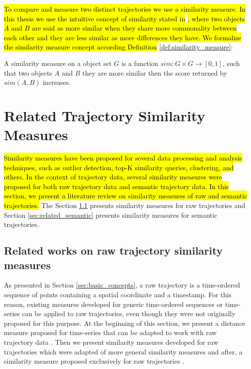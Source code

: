 \hl{To compare and measure two distinct trajectories we use a similarity measure. In this thesis we use the intuitive concept of similarity stated in }\cite{lin1998information}\hl{, where two objects $A$ and $B$ are said as more similar when they share more commonality between each other and they are less similar as more differences they have. We formalize the similarity measure concept according Definition }\ref{def:similarity_measure}:

\begin{definition}
\label{def:similarity_measure}
A similarity measure on a object set $G$ is a function $sim: G \times G \to [0,1]$, such that two objects $A$ and $B$ they are more similar then the score returned by $sim(A, B)$ increases.
\end{definition}

\section{Related Trajectory Similarity Measures} \label{sec:related_measures}

\hl{Similarity measures have been proposed for several data processing and analysis techniques, such as outlier detection, top-K similarity queries, clustering, and others. In the context of trajectory data, several similarity measures were proposed for both raw trajectory data and semantic trajectory data. In this section, we present a literature review on similarity measures of raw and semantic trajectories.}
The Section \ref{sec:related_raw} presents similarity measures for raw trajectories and Section \ref{sec:related_semantic} presents similarity measures for semantic trajectories.


\subsection{Related works on raw trajectory similarity measures} \label{sec:related_raw}
{As presented in Section {\ref{sec:basic_concepts},} a raw trajectory is a time-ordered sequence of points containing a spatial coordinate and a timestamp. For this reason, existing measures developed for generic time-ordered sequences or time-series can be applied to raw trajectories, even though they were not originally proposed for this purpose. At the beginning of this section, we present a distance measure proposed for time-series }\cite{berndt1994using}{ that can be adapted to work with raw trajectory data }\cite{ten2007multi}{. Then we present similarity measures developed for raw trajectories which were adapted of more general similarity measures }\cite{eiter1994computing, Ding:2008:ESJ:1440463.1440989, vlachos2002discovering, Chen:2004:MLE:1316689.1316758, Chen:2005:RFS:1066157.1066213}{ and after, a similarity measure proposed exclusively for raw trajectories }\cite{Furtado-UMS-2018}.


